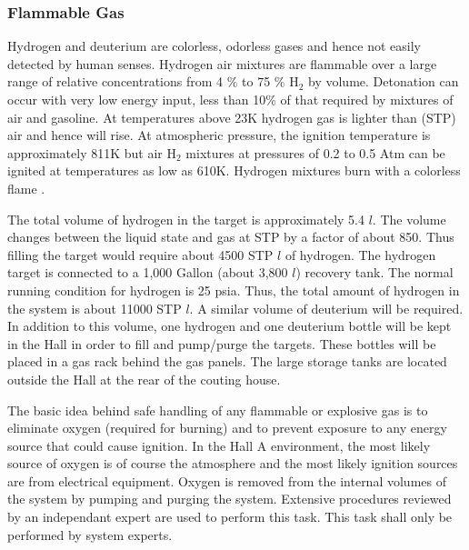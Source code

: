 \begin{safetyen}{10}{5} 


\subsubsection{Flammable Gas}

\label{sec:targ-flammablegas}

Hydrogen and deuterium are colorless, odorless gases and hence not
easily detected by human senses. Hydrogen air mixtures are flammable
over a large range of relative concentrations from 4 $\%$ to 75 $\%$
H$_{2}$ by volume. Detonation can occur with very low energy input,
less than 10\% of that required by mixtures of air and gasoline. At
temperatures above 23K hydrogen gas is lighter than (STP) air and
hence will rise. At atmospheric pressure, the ignition temperature
is approximately 811K but air H$_{2}$ mixtures at pressures of 0.2
to 0.5 Atm can be ignited at temperatures as low as 610K. Hydrogen
mixtures burn with a colorless flame \cite{bi:mc75}.

The total volume of hydrogen in the target is approximately 5.4 $l$.
The volume changes between the liquid state and gas at STP by a factor
of about 850. Thus filling the target would require about 4500 STP
$l$ of hydrogen. The hydrogen target is connected to a 1,000 Gallon
(about 3,800 $l$) recovery tank. The normal running condition for
hydrogen is 25 psia. Thus, the total amount of hydrogen in the system
is about 11000 STP $l$. A similar volume of deuterium will be required.
In addition to this volume, one hydrogen and one deuterium bottle
will be kept in the Hall in order to fill and pump/purge the targets.
These bottles will be placed in a gas rack behind the gas panels.
The large storage tanks are located outside the Hall at the rear of
the couting house.

The basic idea behind safe handling of any flammable or explosive
gas is to eliminate oxygen (required for burning) and to prevent exposure
to any energy source that could cause ignition. In the Hall A environment,
the most likely source of oxygen is of course the atmosphere and the
most likely ignition sources are from electrical equipment. Oxygen
is removed from the internal volumes of the system by pumping and
purging the system. Extensive procedures reviewed by an independant
expert are used to perform this task. This task shall only be performed
by system experts.

\infolevone{ 


}
\end{safetyen}
